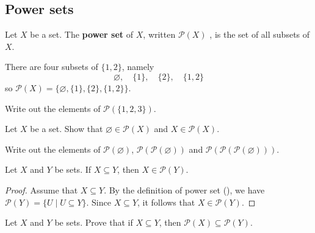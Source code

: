 \subsection*{Power sets}

\begin{definition}
\label{defPowerSet}
Let $X$ be a set. The \textbf{power set} of $X$, written $\mathcal{P}(X)$ , is the set of all subsets of $X$.
\end{definition}

\begin{example}
There are four subsets of $\{ 1, 2 \}$, namely
\[ \varnothing, \quad \{ 1 \}, \quad \{ 2 \}, \quad \{ 1, 2 \} \]
so $\mathcal{P}(X) = \{\varnothing, \{ 1 \}, \{ 2 \}, \{ 1, 2 \}\}$.
\end{example}

\begin{exercise}
Write out the elements of $\mathcal{P}(\{1, 2, 3\})$.
\end{exercise}

\begin{exercise}
Let $X$ be a set. Show that $\varnothing \in \mathcal{P}(X)$ and $X \in \mathcal{P}(X)$.
\end{exercise}

\begin{exercise}
Write out the elements of $\mathcal{P}(\varnothing)$, $\mathcal{P}(\mathcal{P}(\varnothing))$ and $\mathcal{P}(\mathcal{P}(\mathcal{P}(\varnothing)))$.
\end{exercise}

\begin{example}
\label{exSubsetImpliesPowerSetMembership}
Let $X$ and $Y$ be sets. If $X \subseteq Y$, then $X \in \mathcal{P}(Y)$.

\begin{proof}
Assume that $X \subseteq Y$. By the definition of power set (), we have $\mathcal{P}(Y) = \{U \mid U \subseteq Y\}$. Since $X \subseteq Y$, it follows that $X \in \mathcal{P}(Y)$.
\end{proof}
\end{example}

\begin{exercise}
Let $X$ and $Y$ be sets. Prove that if $X \subseteq Y$, then $\mathcal{P}(X) \subseteq \mathcal{P}(Y)$.
\end{exercise}

